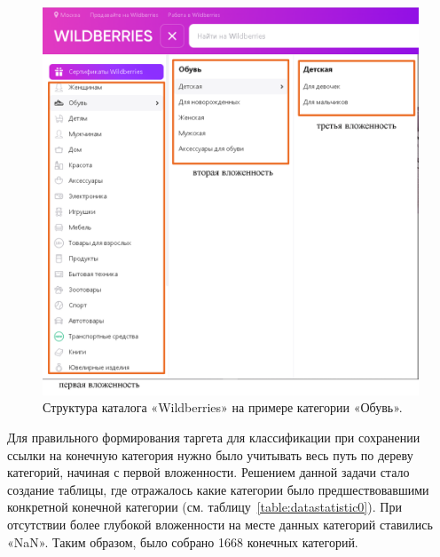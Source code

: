 \documentclass[a4paper,12pt]{extarticle}
\begin{document}
\begin{figure}[hbtp]
	\centering
	\includegraphics[scale=0.8]{wildberries1.png}
	\caption{Структура каталога «Wildberries» на примере категории «Обувь».}
	\label{fig:wildberries1}
\end{figure} 

Для правильного формирования таргета для классификации при сохранении ссылки на конечную категория нужно было учитывать весь путь по дереву категорий, начиная с первой вложенности. Решением данной задачи стало создание таблицы, где отражалось какие категории было предшествовавшими конкретной конечной категории (см. таблицу~\ref{table:datastatistic0}). При отсутствии более глубокой вложенности на месте данных категорий ставились «NaN». Таким образом, было собрано 1668 конечных категорий.
\end{document}
